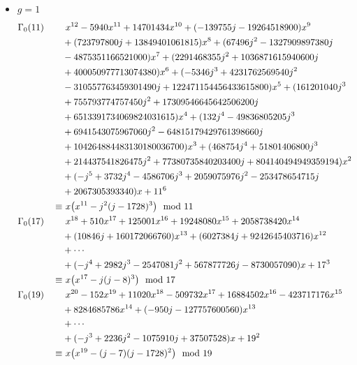 \documentclass{rs}
\theoremstyle{definition}
\theoremstyle{remark}
\newcommand{\md}{~~{\rm mod}~}
\newcommand{\G}{\Gamma}
\renewcommand{\=}{\approx}
\renewcommand{\-}{\sim}
\numberwithin{equation}{section}
\begin{document}
\begin{itemize}
 \item $g = 1$ 
 \[
  \begin{split}
   \G_0(11) \qquad & ~ x^{12}-5940 x^{11}+14701434 x^{10}+(-139755 j-19264518900) x^9 \hskip 2.2cm \\
                   & +(723797800 j +13849401061815) x^8+(67496 j^2-1327909897380 j \\
                   & -4875351166521000) x^7+(2291468355 j^2+1036871615940600 j \\
                   & +400050977713074380) x^6+(-5346 j^3+4231762569540 j^2 \\
                   & -310557763459301490 j+122471154456433615800) x^5+(161201040 j^3 \\
                   & +755793774757450 j^2+17309546645642506200 j \\
                   & +6513391734069824031615) x^4+(132 j^4-49836805205 j^3 \\
                   & +6941543075967060 j^2-64815179429761398660 j \\
                   & +104264884483130180036700) x^3+(468754 j^4+51801406800 j^3 \\
                   & +214437541826475 j^2+77380735840203400 j+804140494949359194) x^2 \\
                   & +(-j^5+3732 j^4-4586706 j^3+2059075976 j^2-253478654715 j \\
                   & +2067305393340) x+11^6 \\
            \equiv & ~ x \big(x^{11} - j^2 (j - 1728)^3\big) \md 11 \\
   \G_0(17) \qquad & ~ x^{18}+510 x^{17}+125001 x^{16}+19248080 x^{15}+2058738420 x^{14} \\
                   & +(10846 j +160172066760) x^{13}+(6027384 j+9242645403716) x^{12} \\
                   & + \cdots \\
                   & +(-j^4+2982 j^3-2547081 j^2 +567877726 j-8730057090) x+17^3 \\
            \equiv & ~ x \big(x^{17} - j (j - 8)^3\big) \md 17 \\
   \G_0(19) \qquad & ~ x^{20}-152 x^{19}+11020 x^{18}-509732 x^{17}+16884502 x^{16}-423717176 x^{15} \\
                   & +8284685786 x^{14}+(-950 j-127757600560) x^{13} \\
                   & + \cdots \\
                   & +(-j^3+2236 j^2-1075910 j +37507528) x+19^2 \\
            \equiv & ~ x \big(x^{19} - (j - 7) (j - 1728)^2\big) \md 19 
  \end{split}
 \]


\end{itemize}
\end{document}
